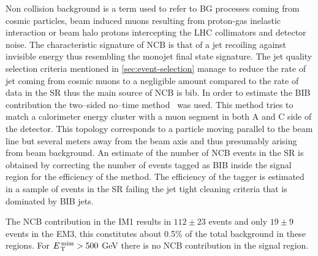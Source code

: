 Non collision background is a term used to refer to BG processes coming from
cosmic particles, beam induced muons resulting from proton-gas inelastic
interaction or beam halo protons intercepting the LHC collimators and detector
noise. The characteristic signature of NCB is that of a jet recoiling against
invisible energy thus resembling the monojet final state signature. The jet
quality selection criteria mentioned in \cref{sec:event-selection} manage to
reduce the rate of jet coming from cosmic muons to a negligible amount compared
to the rate of data in the SR thus the main source of NCB is \gls{bib}. In order
to estimate the BIB contribution the two--sided no--time
method~\cite{BeamInducedBackground} was used. This method tries to match a
calorimeter energy cluster with a muon segment in both A and C side of the
detector. This topology corresponds to a particle moving parallel to the beam
line but several meters away from the beam axis and thus presumably arising from
beam background. An estimate of the number of NCB events in the SR is obtained
by correcting the number of events tagged as BIB inside the signal region for
the efficiency of the method. The efficiency of the tagger is estimated in a
sample of events in the SR failing the jet tight cleaning criteria that is
dominated by BIB jets.

The NCB contribution in the IM1 results in $112 \pm 23$ events and only
$19 \pm 9$ events in the EM3, this constitutes about 0.5\% of the total
background in these regions. For $E_\mathrm{\, T}^\mathrm{\, miss} > 500~$GeV there is no NCB contribution
in the signal region.
